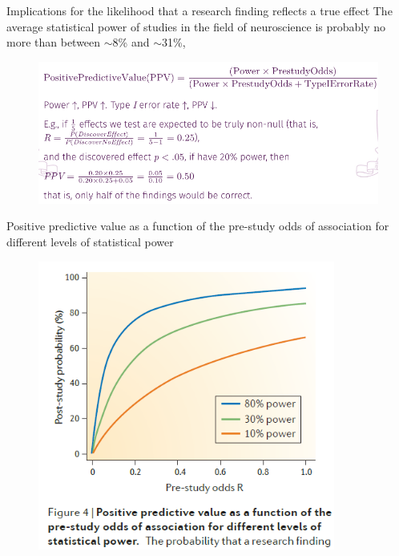 \documentclass{beamer}
\begin{document}
	\begin{frame}{Implications for the likelihood that a research finding reflects a true effect}
		 The average statistical power of studies in the field of neuroscience is probably no more than between $\sim$8\% and $\sim$31\%,
			
		\begin{figure}[H]
			\centering
			\includegraphics[width=1\textwidth]{pics/discussion likelihood.png}
		\end{figure}
	\end{frame}
		
	
	\begin{frame}{Positive predictive value as a function of the pre-study odds of association for different levels of statistical power}
		\begin{figure}[H]
			\centering
			\includegraphics[width=0.87\textwidth]{pics/PPV discussion.png}
		\end{figure}
	\end{frame}
	
\end{document}

